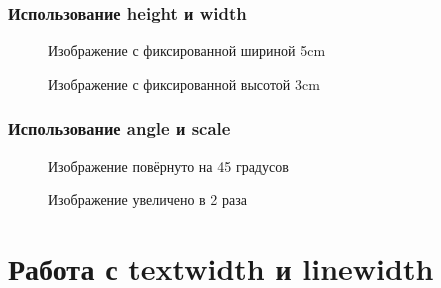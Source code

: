\documentclass[12pt]{article}
\begin{document}
\subsubsection{Использование height и width}
\label{subsubsec:heightwidth}

\lipsum[3]

\begin{figure}[h]
    \centering
    \caption{Изображение с фиксированной шириной 5cm}
    \label{fig:width5cm}
\end{figure}

\begin{figure}[h]
    \centering
    \caption{Изображение с фиксированной высотой 3cm}
    \label{fig:height3cm}
\end{figure}

\subsubsection{Использование angle и scale}
\label{subsubsec:anglescale}

\begin{figure}[h]
    \centering
    \caption{Изображение повёрнуто на 45 градусов}
    \label{fig:angle45}
\end{figure}

\begin{figure}[h]
    \centering
    \caption{Изображение увеличено в 2 раза}
    \label{fig:scale2}
\end{figure}

\lipsum[4]

\section{Работа с textwidth и linewidth}
\label{sec:widths}
\end{document}
